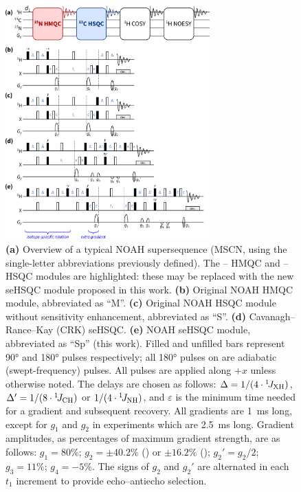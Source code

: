 \documentclass[11pt]{article}
\newcommand*{\carbon}{\ce{^{13}C}}
\newcommand*{\proton}{\ce{^{1}H}}
\newcommand*{\nitrogen}{\ce{^{15}N}}
\newcommand*{\onejxh}{{}^{1}\!J_{\ce{XH}}}
\newcommand*{\onejch}{{}^{1}\!J_{\ce{CH}}}
\newcommand*{\onejnh}{{}^{1}\!J_{\ce{NH}}}
\begin{document}
\begin{figure}
    \centering
    \includegraphics[width=0.7\textwidth]{./figures/pprogs.png}
    \caption{
        \textbf{(a)} Overview of a typical NOAH supersequence (MSCN, using the single-letter abbreviations previously defined\autocite{Kupce2017ACIE}).
        The \nitrogen{}--\proton{} HMQC and \carbon{}--\proton{} HSQC modules are highlighted: these may be replaced with the new seHSQC module proposed in this work.
        \textbf{(b)} Original NOAH HMQC module,\autocite{Kupce2017ACIE, Kupce2007MRC} abbreviated as ``M''.
        \textbf{(c)} Original NOAH HSQC module without sensitivity enhancement,\autocite{Kupce2017ACIE, Schulze-Sunninghausen2017JMR} abbreviated as ``S''.
        \textbf{(d)} Cavanagh--Rance--Kay (CRK) seHSQC.\autocite{sehsqc}
        \textbf{(e)} NOAH seHSQC module, abbreviated as ``Sp'' (this work).
        Filled and unfilled bars represent \ang{90} and \ang{180} pulses respectively; all \ang{180} pulses on \carbon{} are adiabatic (swept-frequency) pulses.
        All pulses are applied along $+x$ unless otherwise noted.
        The delays are chosen as follows: $\Delta = 1/(4\cdot\onejxh)$, $\Delta' = 1/(8\cdot\onejch)$ or $1/(4\cdot\onejnh)$, and $\varepsilon$ is the minimum time needed for a gradient and subsequent recovery.
        All gradients are \SI{1}{\ms} long, except for $g_1$ and $g_2$ in \nitrogen{} experiments which are \SI{2.5}{\ms} long.
        Gradient amplitudes, as percentages of maximum gradient strength, are as follows: $g_1 = 80\%$; $g_2 = \pm 40.2\%$ (\carbon{}) or $\pm 16.2\%$ (\nitrogen{}); ${g_2}' = g_2/2$; $g_3 = 11\%$; $g_4 = -5\%$.
        The signs of $g_2$ and ${g_2}'$ are alternated in each $t_1$ increment to provide echo--antiecho selection.
    }
    \label{fig:pprogs}
\end{figure}
\end{document}
